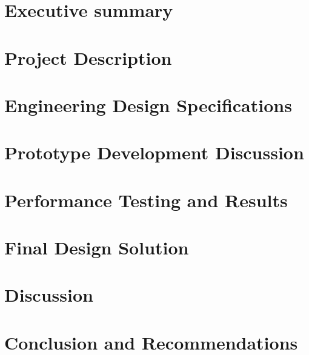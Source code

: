 \documentclass{article}
\begin{document}

\setcounter{tocdepth}{3}
\tableofcontents
\newpage

\section*{Executive summary}
\label{sec:exec-summary}

\newpage

\section{Project Description}
\label{sec:project-description}

\section{Engineering Design Specifications}
\label{sec:engin-design-spec}

\section{Prototype Development Discussion}
\label{sec:prot-devel-disc}

\section{Performance Testing and Results}
\label{sec:perf-test-results}

\section{Final Design Solution}
\label{sec:final-design-solut}

\section{Discussion}
\label{sec:discussion}

\section{Conclusion and Recommendations}
\label{sec:concl-recomm}

\newpage
{}


\end{document}
